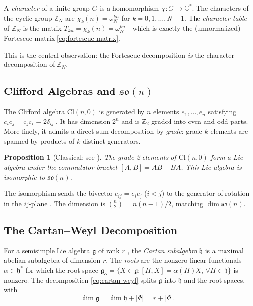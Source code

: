 \documentclass[11pt]{article}
\newtheorem{proposition}[theorem]{Proposition}
\newcommand{\so}{\mathfrak{so}}
\newcommand{\g}{\mathfrak{g}}
\newcommand{\h}{\mathfrak{h}}
\newcommand{\Cl}{\mathrm{Cl}}
\newcommand{\ZZ}{\mathbb{Z}}
\newcommand{\CC}{\mathbb{C}}
\begin{document}
A \emph{character} of a finite group $G$ is a homomorphism
$\chi : G \to \CC^*$. The characters of the cyclic group $\ZZ_N$ are
$\chi_k(n) = \omega_N^{kn}$ for $k = 0, 1, \ldots, N-1$. The
\emph{character table} of $\ZZ_N$ is the matrix
$T_{kn} = \chi_k(n) = \omega_N^{kn}$---which is exactly the
(unnormalized) Fortescue matrix \eqref{eq:fortescue-matrix}.

This is the central observation: the Fortescue decomposition \emph{is}
the character decomposition of $\ZZ_N$.

\subsection{Clifford Algebras and $\so(n)$}

The Clifford algebra $\Cl(n,0)$ is generated by $n$ elements
$e_1, \ldots, e_n$ satisfying $e_i e_j + e_j e_i = 2\delta_{ij}$
\cite{atiyah-bott-shapiro1964,hestenes1966}.
It has dimension $2^n$ and is $\ZZ_2$-graded into even and odd parts.
More finely, it admits a direct-sum decomposition by \emph{grade}:
grade-$k$ elements are spanned by products of $k$ distinct generators.

\begin{proposition}[Classical; see {\cite[Ch.~3]{lounesto2001}}]
\label{prop:grade2-lie}
The grade-2 elements of\/ $\Cl(n,0)$ form a Lie algebra under the
commutator bracket $[A, B] = AB - BA$. This Lie algebra is isomorphic
to $\so(n)$.
\end{proposition}

The isomorphism sends the bivector $e_{ij} = e_i e_j$ ($i < j$) to the
generator of rotation in the $ij$-plane
\cite{gallier2020}. The dimension is
$\binom{n}{2} = n(n-1)/2$, matching $\dim \so(n)$.

\subsection{The Cartan--Weyl Decomposition}

For a semisimple Lie algebra $\g$ of rank $r$
\cite{humphreys1972,hall2015}, the
\emph{Cartan subalgebra} $\h$ is a maximal abelian subalgebra of
dimension $r$. The \emph{roots} are the nonzero linear functionals
$\alpha \in \h^*$ for which the root space
$\g_\alpha = \{X \in \g : [H, X] = \alpha(H) X, \, \forall H \in \h\}$
is nonzero. The decomposition \eqref{eq:cartan-weyl} splits $\g$ into
$\h$ and the root spaces, with
\begin{equation}\label{eq:dim-decomp}
  \dim \g = \dim \h + |\Phi| = r + |\Phi|.
\end{equation}
\end{document}

